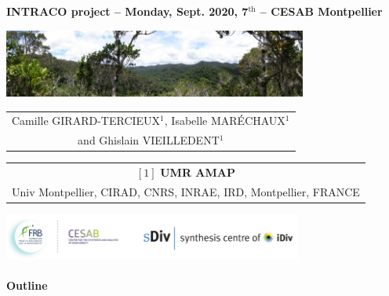 {

  \begin{frame}
    \begin{center}
        \small{\textbf{INTRACO project -- Monday, Sept. 2020, 7$^{\text{th}}$ -- CESAB Montpellier}}
    \end{center}
    \vspace{-0.25cm}
    \titlepage %
    \vspace{-2.5cm}
    \begin{center}
      \includegraphics[width=10cm]{figs/Banniere.png}
    \end{center}
    \vspace{0.25cm}
    \begin{center}

        \begin{tabular}{c}
          Camille \uppercase{Girard-Tercieux}$^{1}$, Isabelle \uppercase{Maréchaux}$^{1}$ \\ and Ghislain \uppercase{Vieilledent}$^{1}$
        \end{tabular}

      \vspace{0.25cm}

      {\small
        \begin{tabular}{c}
          $[1]$ \textbf{UMR AMAP} \\ Univ Montpellier, CIRAD, CNRS, INRAE, IRD, Montpellier, FRANCE
        \end{tabular}
      }

      \vspace{0.25cm}

      \includegraphics[height=1.5cm]{figs/logos-FRB-Cesab-iDiv-sDiv}

    \end{center}
    
  \end{frame}
}
\setcounter{framenumber}{0}


\placelogotrue
\begin{frame}
  \framesubtitle{Outline}
  \begin{columns}[c]
    \begin{column}{0.5\textwidth}
      \tableofcontents[sections={1-2}]
    \end{column}
    \begin{column}{0.5\textwidth}
      \tableofcontents[sections={3-4}]
    \end{column}
  \end{columns}
\end{frame}
\placelogofalse